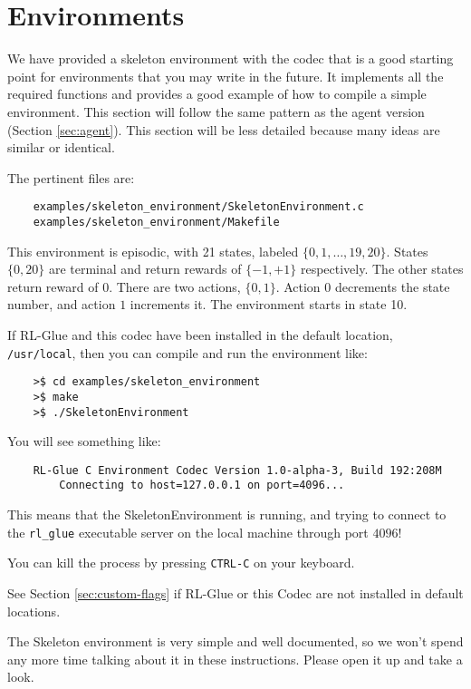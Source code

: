 \documentclass[11pt]{article}
\begin{document}
\section{Environments}
We have provided a skeleton environment with the codec that is a good starting point for environments that you may write in the future.
It implements all the required functions and provides a good example of how to compile a simple environment.  This section will follow the same 
pattern as the agent version (Section \ref{sec:agent}).  This section will be less detailed because many ideas are similar or identical.

The pertinent files are:
\begin{verbatim}
	examples/skeleton_environment/SkeletonEnvironment.c
	examples/skeleton_environment/Makefile
\end{verbatim}

This environment is episodic, with 21 states, labeled $\{0, 1,\ldots,19,20\}$. States $\{0, 20\}$ are terminal and return rewards of $\{-1, +1\}$ respectively.  The other states return reward of $0$.
There are two actions, $\{0, 1\}$.  Action $0$ decrements the state number, and action $1$ increments it. The environment starts in state 10.

If RL-Glue and this codec have been installed in the default location, \texttt{/usr/local}, then you can compile and run the environment like:
\begin{verbatim}
	>$ cd examples/skeleton_environment
	>$ make
	>$ ./SkeletonEnvironment
\end{verbatim}

You will see something like:
\begin{verbatim}
	RL-Glue C Environment Codec Version 1.0-alpha-3, Build 192:208M
		Connecting to host=127.0.0.1 on port=4096...
\end{verbatim}

This means that the SkeletonEnvironment is running, and trying to connect to the \texttt{rl\_glue} executable server on the local machine through port $4096$! 

You can kill the process by pressing \texttt{CTRL-C} on your keyboard.

See Section \ref{sec:custom-flags} if RL-Glue or this Codec are not installed in default locations.

The Skeleton environment is very simple and well documented, so we won't spend any more time talking about it in these instructions.
Please open it up and take a look.
\end{document}
